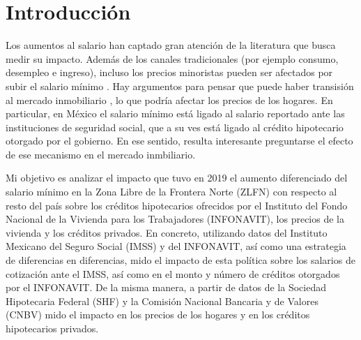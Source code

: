\chapter{Introducción}
\label{ch:intro}



\noindent Los aumentos al salario han captado gran atención de la literatura que busca medir su impacto. Además de los canales tradicionales (por ejemplo consumo, desempleo e ingreso), incluso los precios minoristas pueden ser afectados por subir el salario mínimo \citep{leung_2020}. Hay argumentos para pensar que puede haber transisión al mercado inmobiliario \citep{macurdy_2015,yamagishi_2018,agarwal_ambrose_diop_2019}, lo que podría afectar los precios de los hogares. En particular, en México el salario mínimo está ligado al salario reportado ante las instituciones de seguridad social, que a su ves está ligado al crédito hipotecario otorgado por el gobierno. En ese sentido, resulta interesante preguntarse el efecto de ese mecanismo en el mercado inmbiliario. 

Mi objetivo es analizar el impacto que tuvo en 2019 el aumento diferenciado del salario mínimo en la Zona Libre de la Frontera Norte (ZLFN) con respecto al resto del país sobre los créditos hipotecarios ofrecidos por el Instituto del Fondo Nacional de la Vivienda para los Trabajadores (INFONAVIT), los precios de la vivienda y los créditos privados. En concreto, utilizando datos del Instituto Mexicano del Seguro Social (IMSS) y del INFONAVIT, así como una estrategia de diferencias en diferencias, mido el impacto de esta política sobre los salarios de cotización ante el IMSS, así como en el monto y número de créditos otorgados por el INFONAVIT. De la misma manera, a partir de datos de la Sociedad Hipotecaria Federal (SHF) y la Comisión Nacional Bancaria y de Valores (CNBV) mido el impacto en los precios de los hogares y en los créditos hipotecarios privados.


